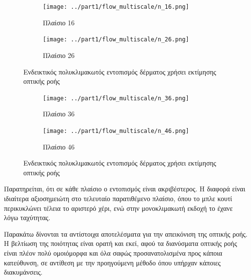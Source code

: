 \documentclass{article}
\begin{document}
\begin{figure}[h]
    \centering
    \begin{subfigure}[b]{0.49\textwidth}
        \centering{}
        \texttt{[image: ../part1/flow\_multiscale/n\_16.png]}
        \caption{Πλαίσιο 16}
        \label{fig:}
    \end{subfigure}
    \hfill
    \begin{subfigure}[b]{0.49\textwidth}  
        \centering 
        \texttt{[image: ../part1/flow\_multiscale/n\_26.png]}
        \caption{Πλαίσιο 26}
        \label{fig:}
    \end{subfigure}
    \caption{Ενδεικτικός πολυκλιμακωτός εντοπισμός δέρματος χρήσει εκτίμησης οπτικής ροής}
    \label{fig:tracking_multiscale1}
\end{figure}
\begin{figure}[h]
    \begin{subfigure}[b]{0.49\textwidth}   
        \centering 
        \texttt{[image: ../part1/flow\_multiscale/n\_36.png]}
        \caption{Πλαίσιο 36}
        \label{fig:}
    \end{subfigure}
    \hfill
    \begin{subfigure}[b]{0.49\textwidth}   
        \centering 
        \texttt{[image: ../part1/flow\_multiscale/n\_46.png]}
        \caption{Πλαίσιο 46}
        \label{fig:}
    \end{subfigure}
    \caption{Ενδεικτικός πολυκλιμακωτός εντοπισμός δέρματος χρήσει εκτίμησης οπτικής ροής}
    \label{fig:tracking_multiscale2}
\end{figure}
\FloatBarrier

Παρατηρείται, ότι σε κάθε πλαίσιο ο εντοπισμός είναι ακριβέστερος. Η διαφορά είναι ιδιαίτερα αξιοσημειώτη στο τελευταίο παρατιθέμενο πλαίσιο, όπου το μπλε κουτί περικυκλώνει τέλεια το αριστερό χέρι, ενώ στην μονοκλιμακωτή εκδοχή το έχανε λόγω ταχύτητας.

Παρακάτω δίνονται τα αντίστοιχα αποτελέσματα για την απεικόνιση της οπτικής ροής. Η βελτίωση της ποιότητας είναι ορατή και εκεί, αφού τα διανύσματα οπτικής ροής είναι πλέον πολύ ομοιόμορφα και όλα σαφώς προσανατολισμένα προς κάποια κατεύθυνση, σε αντίθεση με την προηγούμενη μέθοδο όπου υπήρχαν κάποιες διακυμάνσεις. 
\end{document}
